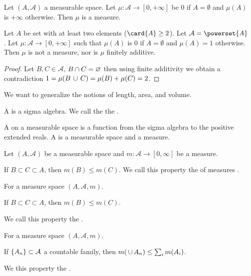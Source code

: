 \begin{expl}
Let $(A, \mathcal{A})$ a measurable
space.
Let $\mu: \mathcal{A} \to [0, +\infty]$
be $0$ if $A = \emptyset$ and
$\mu(A)$ is $+\infty$ otherwise.
Then $\mu$ is a measure.
\end{expl}

\begin{expl}
Let $A$ be set with at least
two elements ($\card{A} \geq 2$).
Let $\mathcal{A} = \powerset{A}$.
Let $\mu: \mathcal{A} \to [0, +\infty]$
such that $\mu(A)$ is $0$ if $A = \emptyset$
and $\mu(A) = 1$ otherwise.
Then $\mu$ is not a measure,
nor is $\mu$ finitely additive.
\begin{proof}
Let $B, C \in \mathcal{A}$,
$B \cap C = \varnothing$
then using finite additivity
we obtain a contradiction
$
1 = \mu(B \,\cup\, C) = \mu(B) + \mu(C) = 2
$.
\end{proof}
\end{expl}


We want to generalize the notions
of length, area, and volume.


A
is a sigma algebra.
We call the
the .

A
on a measurable space
is a function from the sigma algebra
to the positive extended reals.
A
is a measurable space and a measure.



\begin{prop}
  Let $(A, \mathcal{A})$ be a measurable space and
  $m: \mathcal{A} \to [0, \infty]$ be a measure.

  If $B \subset C \subset A$, then $m(B) \leq m(C)$.
  We call this property the of measures
  .
\end{prop}

\begin{prop}
  For a measure space $(A, \mathcal{A}, m)$.

  If $B \subset C \subset A$, then $m(B) \leq m(C)$.

  We call this property the
  .
\end{prop}

\begin{prop}
  For a measure space $(A, \mathcal{A}, m)$.

  If $\{A_n\} \subset \mathcal{A}$ a countable family,
  then $m(\,\cup\, A_n) \leq \sum_{i} m(A_i)$.

  We this property the
  .
\end{prop}


